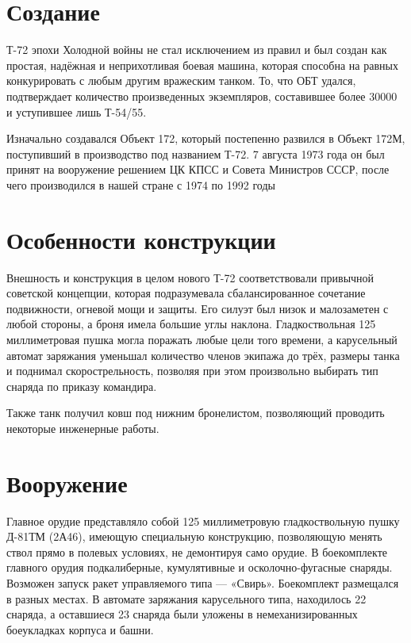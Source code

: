 \section{Создание}
	 Т-72 эпохи Холодной войны не стал исключением из правил и был создан как простая, надёжная и неприхотливая боевая машина, которая способна на равных конкурировать с любым другим вражеским танком. То, что ОБТ удался, подтверждает количество произведенных экземпляров, составившее более 30000 и уступившее лишь Т-54/55.

Изначально создавался Объект 172, который постепенно развился в Объект 172М, поступивший в производство под названием Т-72. 7 августа 1973 года он был принят на вооружение решением ЦК КПСС и Совета Министров СССР, после чего производился в нашей стране с 1974 по 1992 годы


\section{Особенности конструкции}

	Внешность и конструкция в целом нового Т-72 соответствовали привычной советской концепции, которая подразумевала сбалансированное сочетание подвижности, огневой мощи и защиты. Его силуэт был низок и малозаметен с любой стороны, а броня имела большие углы наклона. Гладкоствольная 125 миллиметровая пушка могла поражать любые цели того времени, а карусельный автомат заряжания уменьшал количество членов экипажа до трёх, размеры танка и поднимал скорострельность, позволяя при этом произвольно выбирать тип снаряда по приказу командира.

	Также танк получил ковш под нижним бронелистом, позволяющий проводить некоторые инженерные работы.



\section{Вооружение}

	Главное орудие представляло собой 125 миллиметровую гладкоствольную пушку Д-81ТМ (2А46), имеющую специальную конструкцию, позволяющую менять ствол прямо в полевых условиях, не демонтируя само орудие. В боекомплекте главного орудия подкалиберные, кумулятивные и осколочно-фугасные снаряды. Возможен запуск ракет управляемого типа — «Свирь». Боекомплект размещался в разных местах. В автомате заряжания карусельного типа, находилось 22 снаряда, а оставшиеся 23 снаряда были уложены в немеханизированных боеукладках корпуса и башни.

